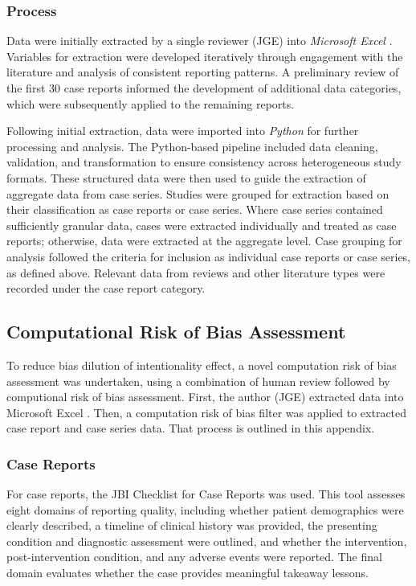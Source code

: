 \begin{appendices}
\subsubsection{Process}

Data were initially extracted by a single reviewer (JGE) into \textit{Microsoft Excel} \cite{MicrosoftCorporation_2025}. Variables for extraction were developed iteratively through engagement with the literature and analysis of consistent reporting patterns. A preliminary review of the first 30 case reports informed the development of additional data categories, which were subsequently applied to the remaining reports. 

Following initial extraction, data were imported into \textit{Python} \cite{PythonSoftwareFoundation_2025} for further processing and analysis. The Python-based pipeline included data cleaning, validation, and transformation to ensure consistency across heterogeneous study formats. These structured data were then used to guide the extraction of aggregate data from case series. Studies were grouped for extraction based on their classification as case reports or case series. Where case series contained sufficiently granular data, cases were extracted individually and treated as case reports; otherwise, data were extracted at the aggregate level. Case grouping for analysis followed the criteria for inclusion as individual case reports or case series, as defined above. Relevant data from reviews and other literature types were recorded under the case report category.

\subsection{Computational Risk of Bias Assessment}
\label{appendix:bias}

To reduce bias dilution of intentionality effect, a novel computation risk of bias assessment was undertaken, using a combination of human review followed by computional risk of bias assessment. First, the author (JGE) extracted data into Microsoft Excel \cite{MicrosoftCorporation_2025}. Then, a computation risk of bias filter was applied to extracted case report and case series data. That process is outlined in this appendix.

\subsubsection{Case Reports}
For case reports, the JBI Checklist for Case Reports was used. This tool assesses eight domains of reporting quality, including whether patient demographics were clearly described, a timeline of clinical history was provided, the presenting condition and diagnostic assessment were outlined, and whether the intervention, post-intervention condition, and any adverse events were reported. The final domain evaluates whether the case provides meaningful takeaway lessons.


\end{appendices}
